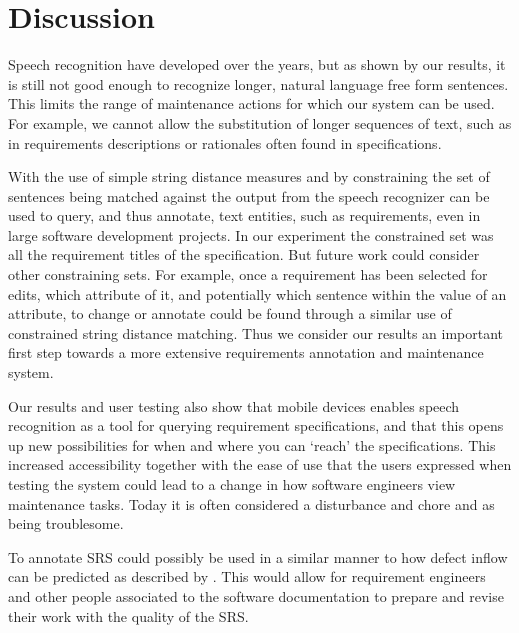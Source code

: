 \documentclass[conference]{IEEEtran}
\begin{document}
\section{Discussion}
\label{sec:disc}
Speech recognition have developed over the years, but as shown by our results, it is still not good enough to recognize longer, natural language free form sentences.
This limits the range of maintenance actions for which our system can be used.
For example, we cannot allow the substitution of longer sequences of text, such as in requirements descriptions or rationales often found in specifications.

With the use of simple string distance measures and by constraining the set of sentences being matched against the output from the speech recognizer can be used to query, and thus annotate, text entities, such as requirements, even in large software development projects.
In our experiment the constrained set was all the requirement titles of the specification.
But future work could consider other constraining sets.
For example, once a requirement has been selected for edits, which attribute of it, and potentially which sentence within the value of an attribute, to change or annotate could be found through a similar use of constrained string distance matching.
Thus we consider our results an important first step towards a more extensive requirements annotation and maintenance system.

Our results and user testing also show that mobile devices enables speech recognition as a tool for querying requirement specifications, and that this opens up new possibilities for when and where you can `reach' the specifications. 
This increased accessibility together with the ease of use that the users expressed when testing the system could lead to a change in how software engineers view maintenance tasks.
Today it is often considered a disturbance and chore and as being troublesome.

To annotate SRS could possibly be used in a similar manner to how defect inflow can be predicted as described by \citet{mstaronmetrics}. This would allow for requirement engineers and other people associated to the software documentation to prepare and revise their work with the quality of the SRS.
\end{document}
